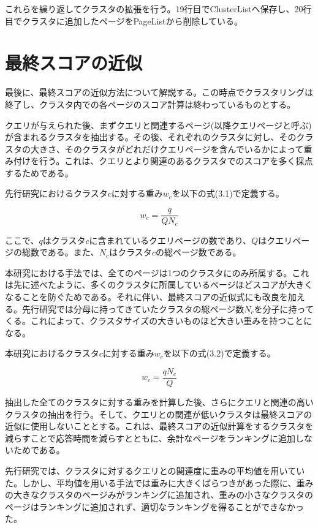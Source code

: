 \documentclass[a4paper,11pt]{jreport}
\begin{document}
これらを繰り返してクラスタの拡張を行う。19行目でClusterListへ保存し、20行目でクラスタに追加したページをPageListから削除している。

\newpage

\section{最終スコアの近似}

最後に、最終スコアの近似方法について解説する。この時点でクラスタリングは終了し、クラスタ内での各ページのスコア計算は終わっているものとする。

クエリが与えられた後、まずクエリと関連するページ(以降クエリページと呼ぶ)が含まれるクラスタを抽出する。その後、それぞれのクラスタに対し、そのクラスタの大きさ、そのクラスタがどれだけクエリページを含んでいるかによって重み付けを行う。これは、クエリとより関連のあるクラスタでのスコアを多く採点するためである。

先行研究におけるクラスタ$c$に対する重み$w_c$を以下の式(3.1)で定義する。

\begin{equation}
w_c = \frac{q}{QN_c}
\end{equation}

ここで、$q$はクラスタ$c$に含まれているクエリページの数であり、$Q$はクエリページの総数である。また、$N_c$はクラスタ$c$の総ページ数である。

本研究における手法では、全てのページは1つのクラスタにのみ所属する。これは先に述べたように、多くのクラスタに所属しているページほどスコアが大きくなることを防ぐためである。それに伴い、最終スコアの近似式にも改良を加える。先行研究では分母に持ってきていたクラスタの総ページ数$N_c$を分子に持ってくる。これによって、クラスタサイズの大きいものほど大きい重みを持つことになる。

本研究におけるクラスタ$c$に対する重み$w_c$を以下の式(3.2)で定義する。

\begin{equation}
w_c = \frac{qN_c}{Q}
\end{equation}

抽出した全てのクラスタに対する重みを計算した後、さらにクエリと関連の高いクラスタの抽出を行う。そして、クエリとの関連が低いクラスタは最終スコアの近似に使用しないこととする。これは、最終スコアの近似計算をするクラスタを減らすことで応答時間を減らすとともに、余計なページをランキングに追加しないためである。

先行研究では、クラスタに対するクエリとの関連度に重みの平均値を用いていた。しかし、平均値を用いる手法では重みに大きくばらつきがあった際に、重みの大きなクラスタのページみがランキングに追加され、重みの小さなクラスタのページはランキングに追加されず、適切なランキングを得ることができなかった。
\end{document}
